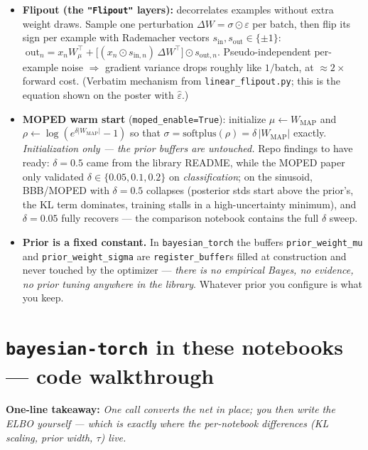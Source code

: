 \documentclass[10pt,a4paper]{article}
\newcommand{\code}[1]{\texttt{#1}}
\newcommand{\takeaway}[1]{\textbf{One-line takeaway:} \emph{#1}}
\begin{document}
\begin{itemize}
  $w=\mu+\sigma\odot\varepsilon$,
  $\varepsilon\sim\mathcal{N}(0,I)$, so the expectation becomes differentiable in $(\mu,\rho)$.
  One weight draw per forward pass, \emph{shared by the whole minibatch} $\Rightarrow$ per-example
  gradients are correlated $\Rightarrow$ high gradient variance.
\item \textbf{Flipout (the \code{"Flipout"} layers):} decorrelates examples without extra weight
  draws. Sample one perturbation $\Delta W=\sigma\odot\varepsilon$ per batch, then flip its sign
  per example with Rademacher vectors $s_{\text{in}},s_{\text{out}}\in\{\pm1\}$:
  $\;\text{out}_n = x_n W_\mu^\top + \bigl[(x_n\odot s_{\text{in},n})\,\Delta W^\top\bigr]\odot
  s_{\text{out},n}$. Pseudo-independent per-example noise $\Rightarrow$ gradient variance drops
  roughly like $1/$batch, at $\approx2\times$ forward cost. (Verbatim mechanism from
  \code{linear\_flipout.py}; this is the equation shown on the poster with
  $\hat\varepsilon$.)
\item \textbf{MOPED warm start} (\code{moped\_enable=True}): initialize
  $\mu\leftarrow W_{\text{MAP}}$ and $\rho\leftarrow\log(e^{\delta|W_{\text{MAP}}|}-1)$ so that
  $\sigma=\mathrm{softplus}(\rho)=\delta\,|W_{\text{MAP}}|$ exactly. \emph{Initialization only ---
  the prior buffers are untouched.} Repo findings to have ready: $\delta=0.5$ came from the
  library README, while the MOPED paper only validated $\delta\in\{0.05,0.1,0.2\}$ on
  \emph{classification}; on the sinusoid, BBB/MOPED with $\delta=0.5$ collapses (posterior stds
  start above the prior's, the KL term dominates, training stalls in a high-uncertainty minimum),
  and $\delta=0.05$ fully recovers --- the comparison notebook contains the full $\delta$ sweep.
\item \textbf{Prior is a fixed constant.} In \code{bayesian\_torch} the buffers
  \code{prior\_weight\_mu} and \code{prior\_weight\_sigma} are \code{register\_buffer}s filled at
  construction and never touched by the optimizer --- \emph{there is no empirical Bayes, no
  evidence, no prior tuning anywhere in the library}. Whatever prior you configure is what you
  keep.
\end{itemize}

\section{\code{bayesian-torch} in these notebooks --- code walkthrough}\label{sec:btcode}
\takeaway{One call converts the net in place; you then write the ELBO yourself --- which is exactly
where the per-notebook differences (KL scaling, prior width, $\tau$) live.}
\end{document}

